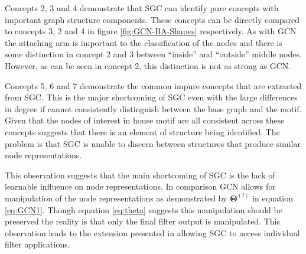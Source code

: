 Concepts 2, 3 and 4 demonstrate that SGC can identify pure concepts with important graph structure components.
These concepts can be directly compared to concepts 3, 2 and 4 in figure \ref{fig:GCN-BA-Shapes} respectively.
As with GCN the attaching arm is important to the classification of the nodes and there is some distinction in concept 2 and 3 between ``inside'' and ``outside'' middle nodes.
However, as can be seen in concept 2, this distinction is not as strong as GCN.

Concepts 5, 6 and 7 demonstrate the common impure concepts that are extracted from SGC.
This is the major shortcoming of SGC even with the large differences in degree if cannot consistently distinguish between the base graph and the motif.
Given that the nodes of interest in house motif are all consistent across these concepts suggests that there is an element of structure being identified.
The problem is that SGC is unable to discern between structures that produce similar node representations.

This observation suggests that the main shortcoming of SGC is the lack of learnable influence on node representations.
In comparison GCN allows for manipulation of the node representations as demonstrated by $\bm{\Theta}^{(l)}$ in equation \ref{eq:GCN1}.
Though equation \ref{eq:theta} suggests this manipulation should be preserved the reality is that only the final filter output is manipulated.
This observation leads to the extension presented in  allowing SGC to access individual filter applications.

